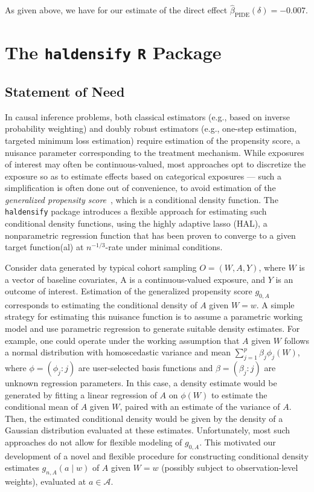 As given above, we have for our estimate of the direct effect
$\hat{\beta}_{\text{PIDE}}({\delta}) = -0.007$.

\section{The \texttt{haldensify} \texttt{R} Package}\label{pkg_haldensify}

\subsection{Statement of Need}

In causal inference problems, both classical estimators (e.g., based on inverse
probability weighting) and doubly robust estimators (e.g., one-step estimation,
targeted minimum loss estimation) require estimation of the propensity score, a
nuisance parameter corresponding to the treatment mechanism. While exposures of
interest may often be continuous-valued, most approaches opt to discretize the
exposure so as to estimate effects based on categorical exposures --- such
a simplification is often done out of convenience, to avoid estimation of the
\textit{generalized propensity score}~\citep{hirano2004propensity,
imai2004causal}, which is a conditional density function. The
\texttt{haldensify} package introduces a flexible approach for estimating such
conditional density functions, using the highly adaptive lasso (HAL),
a nonparametric regression function that has been proven to converge to a given
target function(al) at $n^{-1/3}$-rate under minimal conditions.

Consider data generated by typical cohort sampling $O = (W, A, Y)$, where $W$ is
a vector of baseline covariates, A is a continuous-valued exposure, and $Y$ is
an outcome of interest. Estimation of the generalized propensity score $g_{0,A}$
corresponds to estimating the conditional density of $A$ given $W = w$. A simple
strategy for estimating this nuisance function is to assume a parametric working
model and use parametric regression to generate suitable density estimates. For
example, one could operate under the working assumption that $A$ given $W$
follows a normal distribution with homoscedastic variance and mean
$\sum_{j=1}^p \beta_j \phi_j(W)$, where $\phi = (\phi_j : j)$ are user-selected
basis functions and $\beta = (\beta_j : j)$ are unknown regression parameters.
In this case, a density estimate would be generated by fitting a linear
regression of $A$ on $\phi(W)$ to estimate the conditional mean of $A$ given
$W$, paired with an estimate of the variance of $A$. Then, the estimated
conditional density would be given by the density of a Gaussian distribution
evaluated at these estimates. Unfortunately, most such approaches do not allow
for flexible modeling of $g_{0,A}$. This motivated our development of a novel
and flexible procedure for constructing conditional density estimates
$g_{n,A}(a \mid w)$ of $A$ given $W = w$ (possibly subject to observation-level
weights), evaluated at $a \in \mathcal{A}$.

